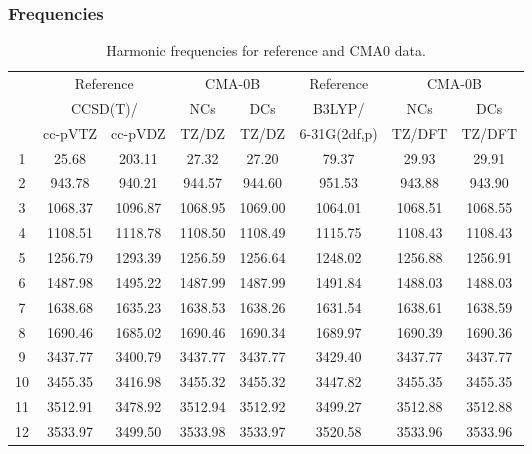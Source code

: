 \documentclass[10pt,oneside]{article}
\begin{document}
\clearpage

\subsubsection*{Frequencies}
\begin{table}[h!]
\centering
\caption{Harmonic frequencies for reference and CMA0 data.}
\begin{tabular}{cccccccc}
\toprule
{} & \multicolumn{2}{c}{Reference} & \multicolumn{2}{c}{CMA-0B} &    Reference & \multicolumn{2}{c}{CMA-0B} \\
{} & \multicolumn{2}{c}{CCSD(T)/} &     NCs &     DCs &       B3LYP/ &     NCs &     DCs \\
{} &   cc-pVTZ & cc-pVDZ &   TZ/DZ &   TZ/DZ & 6-31G(2df,p) &  TZ/DFT &  TZ/DFT \\
\midrule
1  &     25.68 &  203.11 &   27.32 &   27.20 &        79.37 &   29.93 &   29.91 \\
2  &    943.78 &  940.21 &  944.57 &  944.60 &       951.53 &  943.88 &  943.90 \\
3  &   1068.37 & 1096.87 & 1068.95 & 1069.00 &      1064.01 & 1068.51 & 1068.55 \\
4  &   1108.51 & 1118.78 & 1108.50 & 1108.49 &      1115.75 & 1108.43 & 1108.43 \\
5  &   1256.79 & 1293.39 & 1256.59 & 1256.64 &      1248.02 & 1256.88 & 1256.91 \\
6  &   1487.98 & 1495.22 & 1487.99 & 1487.99 &      1491.84 & 1488.03 & 1488.03 \\
7  &   1638.68 & 1635.23 & 1638.53 & 1638.26 &      1631.54 & 1638.61 & 1638.59 \\
8  &   1690.46 & 1685.02 & 1690.46 & 1690.34 &      1689.97 & 1690.39 & 1690.36 \\
9  &   3437.77 & 3400.79 & 3437.77 & 3437.77 &      3429.40 & 3437.77 & 3437.77 \\
10 &   3455.35 & 3416.98 & 3455.32 & 3455.32 &      3447.82 & 3455.35 & 3455.35 \\
11 &   3512.91 & 3478.92 & 3512.94 & 3512.92 &      3499.27 & 3512.88 & 3512.88 \\
12 &   3533.97 & 3499.50 & 3533.98 & 3533.97 &      3520.58 & 3533.96 & 3533.96 \\
\bottomrule
\end{tabular}
\end{table}

\clearpage
\end{document}
